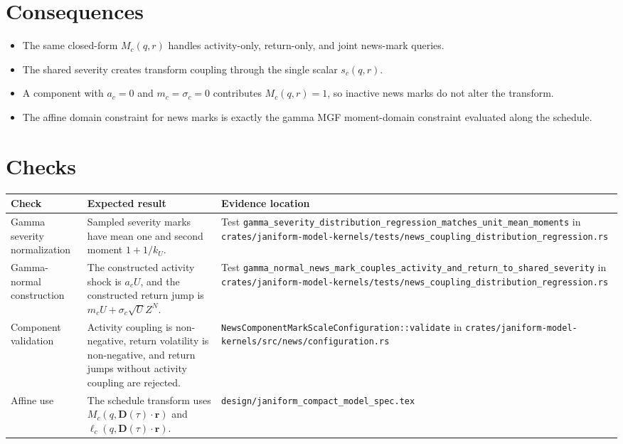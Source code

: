 \documentclass[11pt]{article}
\begin{document}
\section{Consequences}

\begin{itemize}
    \item The same closed-form \(M_c(q,r)\) handles activity-only, return-only, and joint news-mark queries.
    \item The shared severity creates transform coupling through the single scalar \(s_c(q,r)\).
    \item A component with \(a_c=0\) and \(m_c=\sigma_c=0\) contributes \(M_c(q,r)=1\), so inactive news marks do not alter the transform.
    \item The affine domain constraint for news marks is exactly the gamma MGF moment-domain constraint evaluated along the schedule.
\end{itemize}

\section{Checks}

\begin{tabularx}{\textwidth}{XXX}
\toprule
Check & Expected result & Evidence location\\
\midrule
Gamma severity normalization
& Sampled severity marks have mean one and second moment \(1+1/k_U\).
& Test \texttt{gamma\_severity\_distribution\_regression\_matches\_unit\_mean\_moments} in \texttt{crates/janiform-model-kernels/tests/news\_coupling\_distribution\_regression.rs}\\
Gamma-normal construction
& The constructed activity shock is \(a_cU\), and the constructed return jump is \(m_cU+\sigma_c\sqrt U Z^N\).
& Test \texttt{gamma\_normal\_news\_mark\_couples\_activity\_and\_return\_to\_shared\_severity} in \texttt{crates/janiform-model-kernels/tests/news\_coupling\_distribution\_regression.rs}\\
Component validation
& Activity coupling is non-negative, return volatility is non-negative, and return jumps without activity coupling are rejected.
& \texttt{NewsComponentMarkScaleConfiguration::validate} in \texttt{crates/janiform-model-kernels/src/news/configuration.rs}\\
Affine use
& The schedule transform uses \(M_c(q,\mathbf D(\tau)\cdot\mathbf r)\) and \(\ell_c(q,\mathbf D(\tau)\cdot\mathbf r)\).
& \texttt{design/janiform\_compact\_model\_spec.tex}\\
\bottomrule
\end{tabularx}
\end{document}
